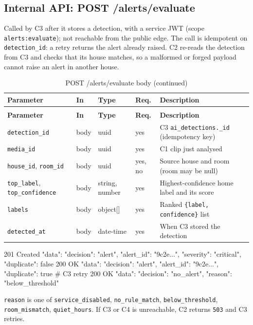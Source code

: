 \subsection{Internal API: POST /alerts/evaluate}
Called by C3 after it stores a detection, with a service JWT (scope \texttt{alerts:evaluate}); not reachable from
the public edge. The call is idempotent on \texttt{detection\_id}: a retry returns the alert already raised. C2
re-reads the detection from C3 and checks that its house matches, so a malformed or forged payload cannot raise an
alert in another house.
\begin{longtable}{L{2.6cm}L{1.3cm}L{1.6cm}L{1.0cm}L{7.4cm}}
\caption{POST /alerts/evaluate body}\\
\toprule
\textbf{Parameter} & \textbf{In} & \textbf{Type} & \textbf{Req.} & \textbf{Description} \\
\midrule
\endfirsthead
\caption[]{POST /alerts/evaluate body (continued)}\\
\toprule
\textbf{Parameter} & \textbf{In} & \textbf{Type} & \textbf{Req.} & \textbf{Description} \\
\midrule
\endhead
\texttt{detection\_id} & body & uuid & yes & C3 \texttt{ai\_detections.\_id} (idempotency key) \\
\texttt{media\_id} & body & uuid & yes & C1 clip just analysed \\
\texttt{house\_id}, \texttt{room\_id} & body & uuid & yes, no & Source house and room (room may be null) \\
\texttt{top\_label}, \texttt{top\_confidence} & body & string, number & yes & Highest-confidence home label and its score \\
\texttt{labels} & body & object[] & yes & Ranked \texttt{\{label, confidence\}} list \\
\texttt{detected\_at} & body & date-time & yes & When C3 stored the detection \\
\bottomrule
\end{longtable}
\begin{Shaded}
\begin{Code}
201 Created  { "data": { "decision": "alert", "alert_id": "9c2e...", "severity": "critical", "duplicate": false } }
200 OK       { "data": { "decision": "alert", "alert_id": "9c2e...", "duplicate": true } }        # C3 retry
200 OK       { "data": { "decision": "no_alert", "reason": "below_threshold" } }
\end{Code}
\end{Shaded}
\noindent \texttt{reason} is one of \texttt{service\_disabled}, \texttt{no\_rule\_match}, \texttt{below\_threshold},
\texttt{room\_mismatch}, \texttt{quiet\_hours}. If C3 or C4 is unreachable, C2 returns \texttt{503} and C3 retries.

